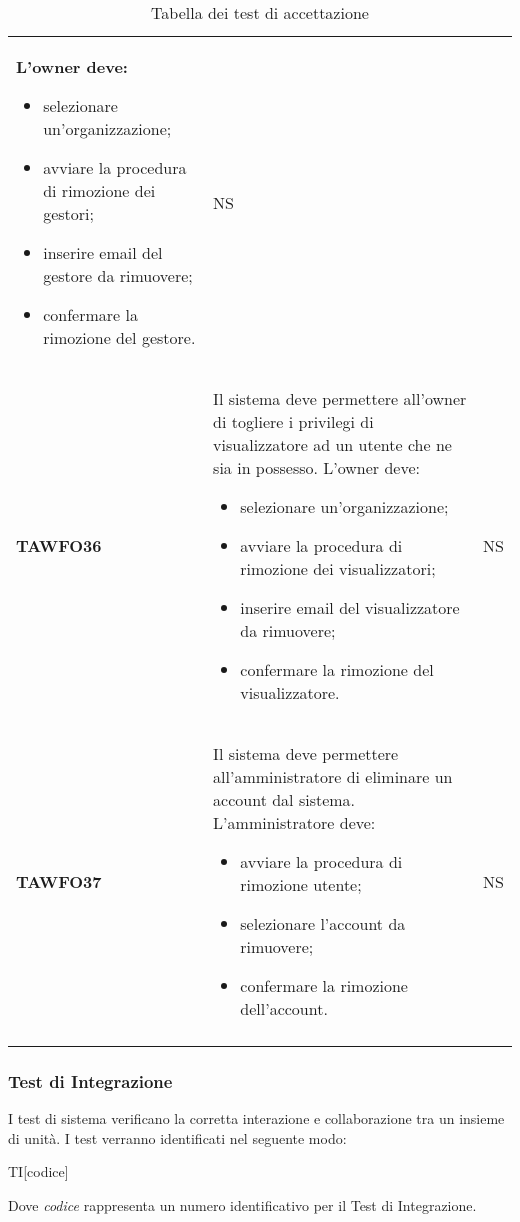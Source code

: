 \documentclass[../piano-di-qualifica.tex]{subfiles}
\begin{document}
\begin{centering}
\begin{longtable}[H]{>{\centering\bfseries}m{3cm} >{}p{10cm} >{\centering\arraybackslash}m{3cm}}
                L'owner deve:
                \begin{itemize}
                \item selezionare un'organizzazione;
                \item avviare la procedura di rimozione dei gestori;
                \item inserire email del gestore da rimuovere;
                \item confermare la rimozione del gestore.
                \end{itemize}
                & NS \\
        TAWFO36      & Il sistema deve permettere all'owner di togliere i privilegi di visualizzatore ad un utente che ne sia in possesso. \newline
                L'owner deve:
                \begin{itemize}
                \item selezionare un'organizzazione;
                \item avviare la procedura di rimozione dei visualizzatori;
                \item inserire email del visualizzatore da rimuovere;
                \item confermare la rimozione del visualizzatore.
                \end{itemize}
                & NS \\
        TAWFO37      & Il sistema deve permettere all'amministratore di eliminare un account dal sistema. \newline
                L'amministratore deve:
                \begin{itemize}
                \item avviare la procedura di rimozione utente;
                \item selezionare l'account da rimuovere;
                \item confermare la rimozione dell'account.
                \end{itemize}
                & NS \\
        \caption{Tabella dei test di accettazione}%
        \label{tab:test_accettazione}
      \end{longtable}
    \end{centering}

  \subsubsection{Test di Integrazione}%
  \label{subs:integrazione}
    I test di sistema verificano la corretta interazione e collaborazione tra un insieme di unità. I test verranno identificati nel seguente modo:
    \begin{center}
      TI[codice]
    \end{center}
    Dove \textit{codice} rappresenta un numero identificativo per il Test di Integrazione.
\end{document}
